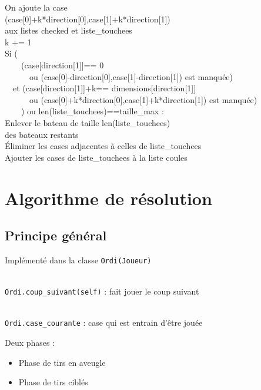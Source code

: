 {\begin{frame}[allowframebreaks]
On ajoute la case\\
 (case[0]+k*direction[0],case[1]+k*direction[1])\\
aux listes checked et liste\_touchees\\
k += 1\\
\framebreak
{}Si (\\
\ \ \ \ (case[direction[1]]== 0 \\
\ \ \ \ \ \ ou (case[0]-direction[0],case[1]-direction[1]) est manquée)\\
\ \ et (case[direction[1]]+k== dimensions[direction[1]] \\
\ \ \ \ \ \ ou (case[0]+k*direction[0],case[1]+k*direction[1]) est manquée)\\
\ \ \ \ ) ou len(liste\_touchees)==taille\_max :\\
Enlever le bateau de taille len(liste\_touchees)\\
des bateaux restants\\
Éliminer les cases adjacentes à celles de liste\_touchees\\
Ajouter les cases de liste\_touchees à la liste coules\\
\end{frame}
}

\section{Algorithme de résolution}
\subsection{Principe général}
\begin{frame}
Implémenté dans la classe \texttt{Ordi(Joueur)}\\~\\ \pause

\texttt{Ordi.coup\_suivant(self)} : fait jouer le coup suivant\\~\\ \pause

 \texttt{Ordi.case\_courante} : case qui est entrain d'être jouée
\end{frame}

\begin{frame}
Deux phases :\pause
\begin{itemize}
\item Phase de tirs en aveugle\pause
\item Phase de tirs ciblés
\end{itemize}
\end{frame}

